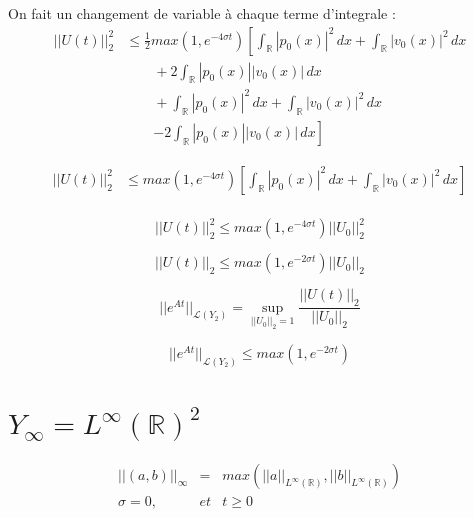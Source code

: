 \documentclass[a4paper,11pt]{article}
\begin{document}
On fait un changement de variable à chaque terme d'integrale :
\begin{equation*}
\begin{split}
    ||U(t)||^{2}_{2} & \le \frac{1}{2} max(1, e^{-4\sigma t}) \left[ \int_{\mathbb{R}}|p_0(x)|^{2} \,dx + \int_{\mathbb{R}} |v_0(x)|^{2} \,dx \right. \\
   & \left. \qquad  + 2 \int_{\mathbb{R}} |p_0(x)| |v_0(x)| \,dx \right. \\
   & \left. \qquad + \int_{\mathbb{R}}|p_0(x)|^{2} \,dx + \int_{\mathbb{R}} |v_0(x)|^{2} \,dx \right. \\
   & \qquad \left. - 2 \int_{\mathbb{R}} |p_0(x)| |v_0(x)| \,dx 
    \right]
\end{split}
\end{equation*}


\begin{equation*}
\begin{split}
    ||U(t)||^{2}_{2} & \le max(1, e^{-4\sigma t}) \left[ \int_{\mathbb{R}}|p_0(x)|^{2} \,dx + \int_{\mathbb{R}} |v_0(x)|^{2} \,dx \right] \\
\end{split}
\end{equation*}


\begin{equation*}
    ||U(t)||^{2}_{2} \le max(1, e^{-4\sigma t}) ||U_{0}||^{2}_{2}
\end{equation*}

\begin{equation*}
    ||U(t)||_{2} \le max(1, e^{-2\sigma t}) ||U_{0}||_{2}
\end{equation*}

\begin{equation*}
||e^{At}||_{\mathcal{L}(Y_{2})} = \sup_{||U_{0}||_{2} = 1}\frac{||U(t)||_{2}}{||U_{0}||_{2}}
\end{equation*}

\begin{equation*}
    ||e^{At}||_{\mathcal{L}(Y_{2})} \le max(1, e^{-2\sigma t})
\end{equation*}


\section{\( Y_{\infty} = L^{\infty}(\mathbb{R})^{2} \)}

\begin{equation*}
\begin{array}{rcl}
    ||(a,b)||_{\infty} &=& max(||a||_{L^{\infty}(\mathbb{R})}, ||b||_{L^{\infty}(\mathbb{R})}) \\
    \sigma = 0, & et & t\ge 0
\end{array}
\end{equation*}
\end{document}
